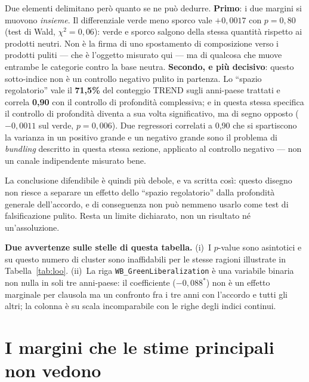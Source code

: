\documentclass[11pt,a4paper]{article}
\begin{document}
Due elementi delimitano per\`o quanto se ne pu\`o dedurre. \textbf{Primo}: i due margini si
muovono \emph{insieme}. Il differenziale verde meno sporco vale $+0{,}0017$ con $p = 0{,}80$
(test di Wald, $\chi^2 = 0{,}06$): verde e sporco salgono della stessa quantit\`a rispetto ai
prodotti neutri. Non \`e la firma di uno spostamento di composizione verso i prodotti puliti
--- che \`e l'oggetto misurato qui --- ma di qualcosa che muove entrambe le categorie contro
la base neutra. \textbf{Secondo, e pi\`u decisivo}: questo sotto-indice non \`e un controllo
negativo pulito in partenza. Lo ``spazio regolatorio'' vale il \textbf{71,5\%} del conteggio
TREND sugli anni-paese trattati e correla \textbf{0,90} con il controllo di profondit\`a
complessiva; e in questa stessa specifica il controllo di profondit\`a diventa a sua volta
significativo, ma di segno opposto ($-0{,}0011$ sul verde, $p = 0{,}006$). Due regressori
correlati a 0,90 che si spartiscono la varianza in un positivo grande e un negativo grande
sono il problema di \emph{bundling} descritto in questa stessa sezione, applicato al
controllo negativo --- non un canale indipendente misurato bene.

La conclusione difendibile \`e quindi pi\`u debole, e va scritta cos\`i: questo disegno non
riesce a separare un effetto dello ``spazio regolatorio'' dalla profondit\`a generale
dell'accordo, e di conseguenza non pu\`o nemmeno usarlo come test di falsificazione pulito.
Resta un limite dichiarato, non un risultato n\'e un'assoluzione.

\textbf{Due avvertenze sulle stelle di questa tabella.} (i)~I $p$-value sono asintotici
e su questo numero di cluster sono inaffidabili per le stesse ragioni illustrate in
Tabella~\ref{tab:loo}. (ii)~La riga \texttt{WB\_GreenLiberalization} \`e una variabile
binaria non nulla in soli tre anni-paese: il coefficiente ($-0{,}088^{*}$) non \`e un effetto
marginale per clausola ma un confronto fra i tre anni con l'accordo e tutti gli altri; la
colonna \`e su scala incomparabile con le righe degli indici continui.



\clearpage
\section{I margini che le stime principali non vedono}
\end{document}
